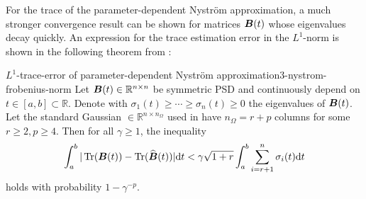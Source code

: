 For the trace of the parameter-dependent Nystr\"om approximation,
a much stronger convergence result can be shown for matrices $\boldsymbol{B}(t)$ whose eigenvalues
decay quickly. An expression for the trace estimation error in the $L^1$-norm is
shown in the following theorem from \cite{he2023parameter}:
\begin{theorem}{$L^1$-trace-error of parameter-dependent Nystr\"om approximation}{3-nystrom-frobenius-norm}
    Let $\boldsymbol{B}(t) \in \mathbb{R}^{n \times n}$ be symmetric \gls{PSD}
    and continuously depend on $t \in [a,b] \subset \mathbb{R}$. 
    Denote with $\sigma_1(t) \geq \cdots \geq \sigma_n(t) \geq 0$ the eigenvalues of $\boldsymbol{B}(t)$. Let the
    standard Gaussian  $\in \mathbb{R}^{n \times n_{\Omega}}$
    used in  have
    $n_{\Omega} = r + p$ columns for some $r \geq 2, p \geq 4$. Then
    for all $\gamma \geq 1$, the inequality
    \begin{equation}
        \int_{a}^{b} | \operatorname{Tr}(\boldsymbol{B}(t)) - \operatorname{Tr}(\widehat{\boldsymbol{B}}(t))| \mathrm{d}t
            < \gamma \sqrt{1 + r} \int_{a}^{b} \sum_{i = r+1}^n \sigma_i(t) \mathrm{d}t
    \end{equation}
    holds with probability $1 - \gamma^{-p}$.
\end{theorem}


